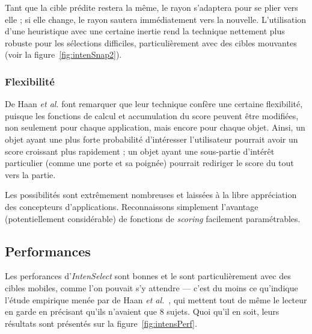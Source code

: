 	Tant que la cible prédite restera la même, le rayon s'adaptera pour se plier vers elle ; si elle change, le rayon sautera immédiatement vers la nouvelle. L'utilisation d'une heuristique avec une certaine \og inertie \fg{} rend la technique nettement plus robuste pour les sélections difficiles, particulièrement avec des cibles mouvantes (voir la figure~\ref{fig:intenSnap2}).
	
	\subsubsection{Flexibilité}
	De Haan \emph{et al.} font remarquer que leur technique confère une certaine flexibilité, puisque les fonctions de calcul et accumulation du score peuvent être modifiées, non seulement pour chaque application, mais encore pour chaque objet. Ainsi, un objet ayant une plus forte probabilité d'intéresser l'utilisateur pourrait avoir un score croissant plus rapidement ; un objet ayant une sous-partie d'intérêt particulier (comme une porte et sa poignée) pourrait rediriger le score du tout vers la partie.
	
	Les possibilités sont extrêmement nombreuses et laissées à la libre appréciation des concepteurs d'applications. Reconnaissons simplement l'avantage (potentiellement considérable) de fonctions de \emph{scoring} facilement paramétrables.
	
	\subsection{Performances}
	Les perforances d'\emph{IntenSelect} sont bonnes et le sont particulièrement avec des cibles mobiles, comme l'on pouvait s'y attendre --- c'est du moins ce qu'indique l'étude empirique menée par de Haan \emph{et al.}~\cite{de2005intenselect}, qui mettent tout de même le lecteur en garde en précisant qu'ils n'avaient que 8 sujets. Quoi qu'il en soit, leurs résultats sont présentés sur la figure~\ref{fig:intensPerf}.
	
